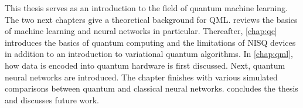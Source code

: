 This thesis serves as an introduction to the field of quantum machine learning.
The two next chapters give a theoretical background for QML.
 reviews the basics of machine learning and neural networks in particular.
Thereafter, \cref{chap:qc} introduces the basics of quantum computing and the limitations of NISQ devices in addition to an introduction to variational quantum algorithms.
In \cref{chap:qml}, how data is encoded into quantum hardware is first discussed. Next, quantum neural networks are introduced.
The chapter finishes with various simulated comparisons between quantum and classical neural networks.
 concludes the thesis and discusses future work.





